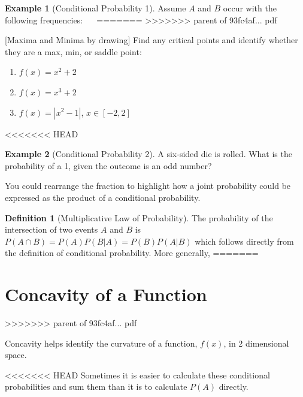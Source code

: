 \documentclass[]{book}
\providecommand{\tightlist}{%
  \setlength{\itemsep}{0pt}\setlength{\parskip}{0pt}}
\theoremstyle{definition}
\newtheorem{definition}{Definition}[chapter]
\theoremstyle{definition}
\newtheorem{example}{Example}[chapter]
\theoremstyle{definition}
\theoremstyle{remark}
\begin{document}
\begin{example}[Conditional Probability 1]
\protect\hypertarget{exm:condprobexm1}{}{\label{exm:condprobexm1} {} }
Assume \(A\) and \(B\) occur with the following frequencies: \(\quad\)
=======
>>>>>>> parent of 93fc4af... pdf

[Maxima and Minima by drawing]
\protect\hypertarget{exm:unnamed-chunk-46}{}{\label{exm:unnamed-chunk-46} {} }
Find any critical points and identify whether they are a max, min, or saddle point:

\begin{enumerate}
\def\labelenumi{\arabic{enumi}.}
\tightlist
\item
  \(f(x)=x^2+2\)
\item
  \(f(x)=x^3+2\)
\item
  \(f(x)=|x^2-1|\), \(x\in [-2,2]\)
\end{enumerate}
\end{example}

<<<<<<< HEAD
\begin{example}[Conditional Probability 2]
\protect\hypertarget{exm:condprobexm2}{}{\label{exm:condprobexm2} {} }
A six-sided die is rolled. What is the probability of a 1, given the outcome is an odd number?
\end{example}

You could rearrange the fraction to highlight how a joint probability could be expressed as the product of a conditional probability.

\begin{definition}[Multiplicative Law of Probability]
\protect\hypertarget{def:unnamed-chunk-68}{}{\label{def:unnamed-chunk-68} {} }
The probability of the intersection of two events \(A\) and \(B\) is \(P(A\cap B)=P(A)P(B|A)=P(B)P(A|B)\) which follows directly from the definition of conditional probability. More generally,
=======
\hypertarget{concavity-of-a-function}{%
\section{Concavity of a Function}\label{concavity-of-a-function}}
>>>>>>> parent of 93fc4af... pdf

Concavity helps identify the curvature of a function, \(f(x)\), in 2 dimensional space.

<<<<<<< HEAD
Sometimes it is easier to calculate these conditional probabilities and sum them than it is to calculate \(P(A)\) directly.
\end{definition}
\end{document}
